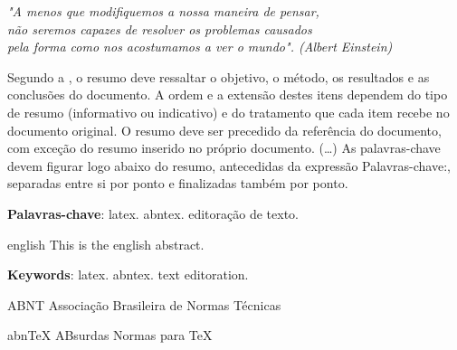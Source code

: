 \documentclass[
12pt,				%
openright,			%
oneside,			%
a4paper,			%
chapter=TITLE,		%
section=TITLE,		%
english,			%
french,				%
spanish,			%
brazil				%
]{abntex2}
\newcommand{\listofquadrosname}{Lista de quadros}
\begin{document}
	\begin{epigrafe}
		\vspace*{\fill}
		\begin{flushright}
			\textit{"A menos que modifiquemos a nossa maneira de pensar,\\ não seremos capazes de resolver os problemas causados \\ pela forma como nos acostumamos a ver o mundo". (Albert Einstein)}
		\end{flushright}
	\end{epigrafe}
	\setlength{\absparsep}{18pt} %
	\begin{resumo}
		Segundo a , o resumo deve ressaltar o
		objetivo, o método, os resultados e as conclusões do documento. A ordem e a extensão
		destes itens dependem do tipo de resumo (informativo ou indicativo) e do
		tratamento que cada item recebe no documento original. O resumo deve ser
		precedido da referência do documento, com exceção do resumo inserido no
		próprio documento. (\ldots) As palavras-chave devem figurar logo abaixo do
		resumo, antecedidas da expressão Palavras-chave:, separadas entre si por
		ponto e finalizadas também por ponto.
		
		\textbf{Palavras-chave}: latex. abntex. editoração de texto.
	\end{resumo}
	
	\begin{resumo}[Abstract]
		\begin{otherlanguage*}{english}
			This is the english abstract.
			
			\vspace{\onelineskip}
			
			\noindent 
			\textbf{Keywords}: latex. abntex. text editoration.
		\end{otherlanguage*}
	\end{resumo}
	
	\listoffigures*
	\cleardoublepage
	\pdfbookmark[0]{\listofquadrosname}{loq}
	\listofquadros*
	\cleardoublepage
	\listoftables*
	\cleardoublepage
	\begin{siglas}
		\item[ABNT] Associação Brasileira de Normas Técnicas
		\item[abnTeX] ABsurdas Normas para TeX
	\end{siglas}
	
\end{document}

